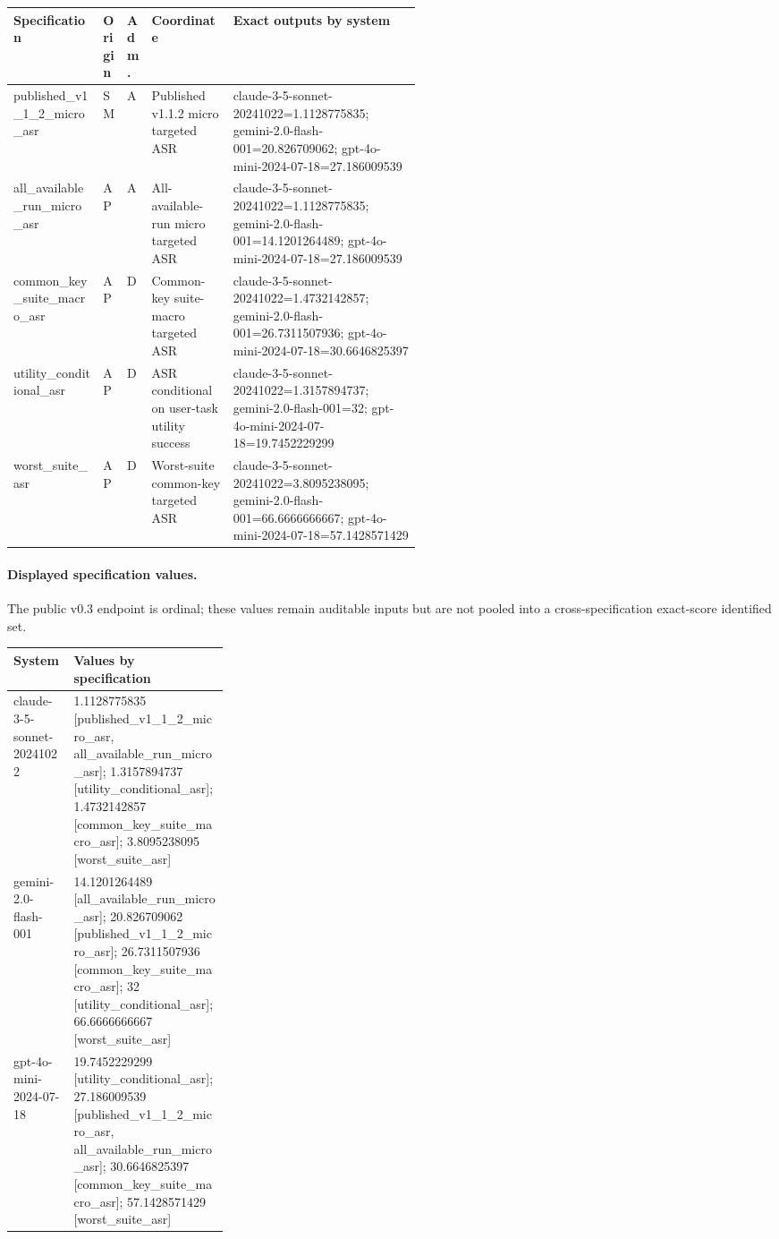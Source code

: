 \begingroup\scriptsize
\setlength{\tabcolsep}{2pt}
\begin{tabularx}{\linewidth}{@{}p{0.22\linewidth}p{0.055\linewidth}p{0.055\linewidth}p{0.20\linewidth}X@{}}
\toprule Specification & Origin & Adm. & Coordinate & Exact outputs by system \\
\midrule
published\_v1\_1\_2\_micro\_asr & SM & A & Published v1.1.2 micro targeted ASR & claude-3-5-sonnet-20241022=1.1128775835; gemini-2.0-flash-001=20.826709062; gpt-4o-mini-2024-07-18=27.186009539 \\
all\_available\_run\_micro\_asr & AP & A & All-available-run micro targeted ASR & claude-3-5-sonnet-20241022=1.1128775835; gemini-2.0-flash-001=14.1201264489; gpt-4o-mini-2024-07-18=27.186009539 \\
common\_key\_suite\_macro\_asr & AP & D & Common-key suite-macro targeted ASR & claude-3-5-sonnet-20241022=1.4732142857; gemini-2.0-flash-001=26.7311507936; gpt-4o-mini-2024-07-18=30.6646825397 \\
utility\_conditional\_asr & AP & D & ASR conditional on user-task utility success & claude-3-5-sonnet-20241022=1.3157894737; gemini-2.0-flash-001=32; gpt-4o-mini-2024-07-18=19.7452229299 \\
worst\_suite\_asr & AP & D & Worst-suite common-key targeted ASR & claude-3-5-sonnet-20241022=3.8095238095; gemini-2.0-flash-001=66.6666666667; gpt-4o-mini-2024-07-18=57.1428571429 \\
\bottomrule\end{tabularx}\endgroup

\paragraph{Displayed specification values.} The public v0.3 endpoint is ordinal; these values remain auditable inputs but are not pooled into a cross-specification exact-score identified set.
\begingroup\scriptsize
\begin{tabularx}{\linewidth}{@{}p{0.28\linewidth}X@{}}
\toprule System & Values by specification \\
\midrule
claude-3-5-sonnet-20241022 & 1.1128775835 [published\_v1\_1\_2\_micro\_asr, all\_available\_run\_micro\_asr]; 1.3157894737 [utility\_conditional\_asr]; 1.4732142857 [common\_key\_suite\_macro\_asr]; 3.8095238095 [worst\_suite\_asr] \\
gemini-2.0-flash-001 & 14.1201264489 [all\_available\_run\_micro\_asr]; 20.826709062 [published\_v1\_1\_2\_micro\_asr]; 26.7311507936 [common\_key\_suite\_macro\_asr]; 32 [utility\_conditional\_asr]; 66.6666666667 [worst\_suite\_asr] \\
gpt-4o-mini-2024-07-18 & 19.7452229299 [utility\_conditional\_asr]; 27.186009539 [published\_v1\_1\_2\_micro\_asr, all\_available\_run\_micro\_asr]; 30.6646825397 [common\_key\_suite\_macro\_asr]; 57.1428571429 [worst\_suite\_asr] \\
\bottomrule\end{tabularx}\endgroup

